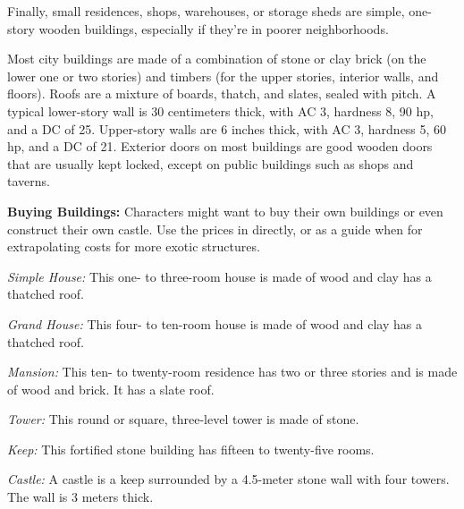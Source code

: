 Finally, small residences, shops, warehouses, or storage sheds are simple, one-story wooden buildings, especially if they're in poorer neighborhoods.

Most city buildings are made of a combination of stone or clay brick (on the lower one or two stories) and timbers (for the upper stories, interior walls, and floors). Roofs are a mixture of boards, thatch, and slates, sealed with pitch. A typical lower-story wall is 30 centimeters thick, with AC 3, hardness 8, 90 hp, and a  DC of 25. Upper-story walls are 6 inches thick, with AC 3, hardness 5, 60 hp, and a  DC of 21. Exterior doors on most buildings are good wooden doors that are usually kept locked, except on public buildings such as shops and taverns.

\textbf{Buying Buildings:} Characters might want to buy their own buildings or even construct their own castle. Use the prices in  directly, or as a guide when for extrapolating costs for more exotic structures.

\textit{Simple House:} This one- to three-room house is made of wood and clay has a thatched roof.

\textit{Grand House:} This four- to ten-room house is made of wood and clay has a thatched roof.

\textit{Mansion:} This ten- to twenty-room residence has two or three stories and is made of wood and brick. It has a slate roof.

\textit{Tower:} This round or square, three-level tower is made of stone.

\textit{Keep:} This fortified stone building has fifteen to twenty-five rooms.

\textit{Castle:} A castle is a keep surrounded by a 4.5-meter stone wall with four towers. The wall is 3 meters thick.

